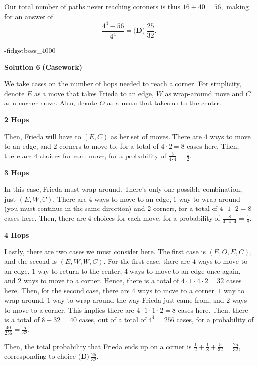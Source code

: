 \begin{enumerate}
 Our total number of paths never reaching coroners is thus $16+40=56,$ making for an answer of 
 \[\frac{4^4-56}{4^4} = \boxed{\textbf{(D)} ~\frac{25}{32}}.\]

 -fidgetboss\_4000

 



\textbf{Solution 6 (Casework)}

We take cases on the number of hops needed to reach a corner. For simplicity, denote $E$ as a move that takes Frieda to an edge, $W$ as wrap-around move and $C$ as a corner move. Also, denote $O$ as a move that takes us to the center.

 \textbf{ 2 Hops }

 Then, Frieda will have to $(E, C)$ as her set of moves. There are $4$ ways to move to an edge, and $2$ corners to move to, for a total of $4 \cdot 2 = 8$ cases here. Then, there are $4$ choices for each move, for a probability of $\frac{8}{4 \cdot 4} = \frac{1}{2}$. 

 \textbf{ 3 Hops }

 In this case, Frieda must wrap-around. There's only one possible combination, just $(E, W, C)$. There are $4$ ways to move to an edge, $1$ way to wrap-around (you must continue in the same direction) and $2$ corners, for a total of $4 \cdot 1 \cdot 2 = 8$ cases here. Then, there are $4$ choices for each move, for a probability of $\frac{8}{4 \cdot 4 \cdot 4} = \frac{1}{8}$. 

 \textbf{ 4 Hops } 

 Lastly, there are two cases we must consider here. The first case is $(E, O, E, C)$, and the second is $(E, W, W, C)$. For the first case, there are $4$ ways to move to an edge, $1$ way to return to the center, $4$ ways to move to an edge once again, and $2$ ways to move to a corner. Hence, there is a total of $4 \cdot 1 \cdot 4 \cdot 2 = 32$ cases here. Then, for the second case, there are $4$ ways to move to a corner, $1$ way to wrap-around, $1$ way to wrap-around the way Frieda just came from, and $2$ ways to move to a corner. This implies there are $4 \cdot 1 \cdot 1 \cdot 2 = 8$ cases here. Then, there is a total of $8+32 = 40$ cases, out of a total of $4^4 = 256$ cases, for a probability of $\frac{40}{256} = \frac{5}{32}$. 

 Then, the total probability that Frieda ends up on a corner is $\frac{1}{2} + \frac{1}{8} + \frac{5}{32} = \frac{25}{32}$, corresponding to choice $\boxed{\textbf{(D)}  ~\frac{25}{32}}$. 


\end{enumerate}
